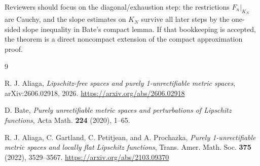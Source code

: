 \documentclass[11pt]{amsart}
\begin{document}
Reviewers should focus on the diagonal/exhaustion step: the restrictions
$F_n|_{K_N}$ are Cauchy, and the slope estimates on $K_N$ survive all later
steps by the one-sided slope inequality in Bate's compact lemma.  If that
bookkeeping is accepted, the theorem is a direct noncompact extension of the
compact approximation proof.

\begin{thebibliography}{9}

R. J. Aliaga,
\emph{Lipschitz-free spaces and purely 1-unrectifiable metric spaces},
arXiv:2606.02918, 2026.
\url{https://arxiv.org/abs/2606.02918}

D. Bate,
\emph{Purely unrectifiable metric spaces and perturbations of Lipschitz functions},
Acta Math. \textbf{224} (2020), 1--65.

R. J. Aliaga, C. Gartland, C. Petitjean, and A. Prochazka,
\emph{Purely 1-unrectifiable metric spaces and locally flat Lipschitz functions},
Trans. Amer. Math. Soc. \textbf{375} (2022), 3529--3567.
\url{https://arxiv.org/abs/2103.09370}

\end{thebibliography}
\end{document}
